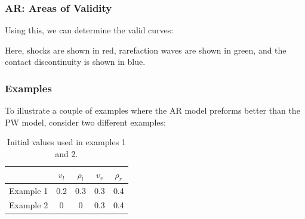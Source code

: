 \documentclass{beamer}
\begin{document}
\begin{frame}
\frametitle{AR: Areas of Validity}
Using this, we can determine the valid curves:
\begin{figure}[h!]
\end{figure}
Here, shocks are shown in red, rarefaction waves are shown in green, and the contact discontinuity is shown in blue.
\end{frame}



\begin{frame}
\frametitle{Examples}

To illustrate a couple of examples where the AR model preforms better than the PW model, consider two different examples: 
\begin{table}[t]
\caption{Initial values used in examples 1 and 2.}
\begin{center}
\begin{tabular}{| c | c c  c c|}
\hline
& $v_l$ & $\rho_l $ & $v_r$ & $\rho_r $\\
\hline
Example 1 & 0.2 & 0.3 & 0.3 & 0.4 \\
Example 2 & 0 & 0 & 0.3 & 0.4\\
\hline
\end{tabular}
\end{center}
\end{table}
\end{frame}
\end{document}
